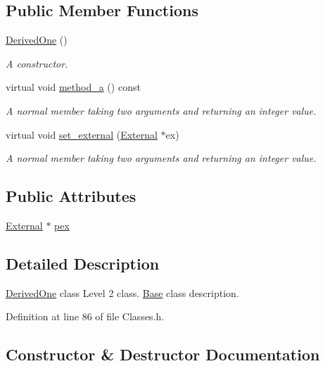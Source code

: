 \subsection*{Public Member Functions}
\begin{DoxyCompactItemize}
\item 
\hyperlink{class_derived_one_a10e249e537ac6388b0b1662a3dfea8f7}{Derived\+One} ()
\begin{DoxyCompactList}\small\item\em A constructor. \end{DoxyCompactList}\item 
virtual void \hyperlink{class_derived_one_a2843e6e6fd03fa84efda261cd1bbc10d}{method\+\_\+a} () const
\begin{DoxyCompactList}\small\item\em A normal member taking two arguments and returning an integer value. \end{DoxyCompactList}\item 
virtual void \hyperlink{class_derived_one_aa98db10f4b7ca15905aa82d942afe51b}{set\+\_\+external} (\hyperlink{class_external}{External} $\ast$ex)
\begin{DoxyCompactList}\small\item\em A normal member taking two arguments and returning an integer value. \end{DoxyCompactList}\end{DoxyCompactItemize}
\subsection*{Public Attributes}
\begin{DoxyCompactItemize}
\item 
\hyperlink{class_external}{External} $\ast$ \hyperlink{class_derived_one_aa55e1fcdabd28d0520ec6e68d530cc77}{pex}
\end{DoxyCompactItemize}


\subsection{Detailed Description}
\hyperlink{class_derived_one}{Derived\+One} class Level 2 class. \hyperlink{class_base}{Base} class description. 

Definition at line 86 of file Classes.\+h.



\subsection{Constructor \& Destructor Documentation}
\mbox{\label{class_derived_one_a10e249e537ac6388b0b1662a3dfea8f7}} 
